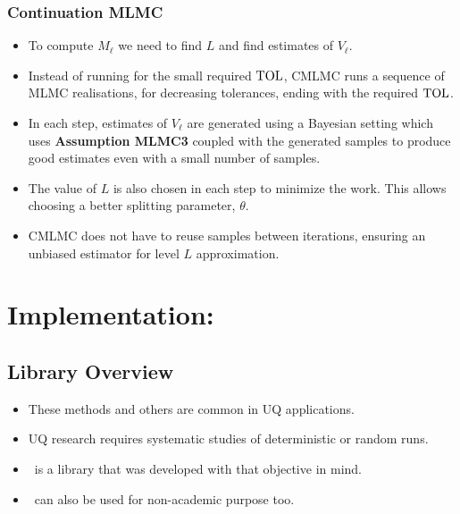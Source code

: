 
\begin{frame}\frametitle{Continuation MLMC}
\begin{itemize}
\item To compute $M_\ell$ we need to find $L$ and find estimates of
  $V_\ell$.
\pause
    \item Instead of running for the small required $\mathrm{TOL}$, CMLMC runs
      a sequence of MLMC realisations, for decreasing
      tolerances, ending with the required $\mathrm{TOL}$.
    \item In each step, estimates of $V_\ell$ are generated using a
      Bayesian setting which uses {\bf Assumption MLMC3} coupled with
      the generated samples to produce good estimates even with a
      small number of samples.
    \item The value of $L$ is also chosen in each step to minimize the
      work. This allows choosing a better splitting parameter,
      $\theta$.
    \item CMLMC does not have to reuse samples between iterations,
      ensuring an unbiased estimator for level $L$ approximation.
  \end{itemize}
\end{frame}



\section{Implementation: \lib}
\subsection{Library Overview}
\begin{frame}
  \begin{itemize}
  \item These methods and others are common in UQ applications.
  \item UQ research requires \alert{systematic} studies of
    deterministic or random runs.
  \item \lib~is a library that was developed with that
    objective in mind.
  \item \lib~can also be used for non-academic purpose too.
  \end{itemize}
\end{frame}

